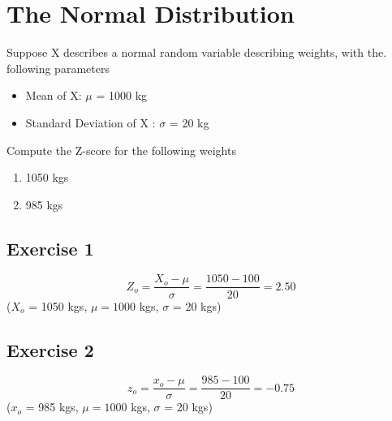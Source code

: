 \documentclass[a4paper,12pt]{article}
\begin{document}
	
	
\section*{The Normal Distribution}
Suppose X describes a normal random variable describing weights, with the.	following parameters
	\begin{itemize}
		\item Mean of X:  $\mu$ = 1000 kg 
		\item Standard Deviation of X : $\sigma$ = 20 kg
	\end{itemize}
	\bigskip
	
\noindent Compute the Z-score for the following weights
	\begin{enumerate}
	    \item 1050 kgs
	    \item 985 kgs
	\end{enumerate} 
	
	
	
	\subsection*{Exercise 1}

	\[ Z_o = \frac{X_o - \mu}{\sigma} = \frac{1050-100}{20} = 2.50  \]
	($X_o$ = 1050 kgs, $\mu = 1000$ kgs, $\sigma$ = 20 kgs)
	
	
	
	\subsection*{Exercise 2}
	
	\[ z_o = \frac{x_o - \mu}{\sigma}  = \frac{985-100}{20} = -0.75  \]
	($x_o$ = 985 kgs, $\mu = 1000$ kgs, $\sigma$ = 20 kgs)
	
\end{document}

